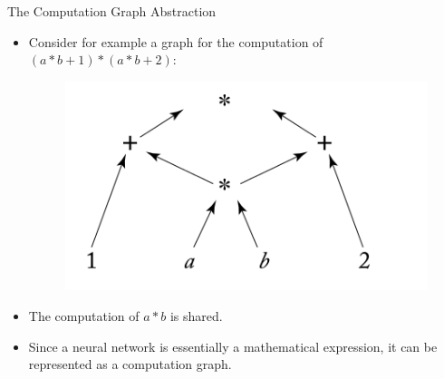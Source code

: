 \documentclass[handout]{beamer}
\begin{document}
\begin{frame}{The Computation Graph Abstraction}
\begin{scriptsize}
\begin{itemize}

\item Consider for example a graph for the computation of $(a*b+1)*(a*b+2)$:

\begin{figure}[htb]
	\centering
	 \includegraphics[scale=0.25]{pics/compGraph.png}
\end{figure}

\item The computation of $a*b$ is shared.

\item Since a neural network is essentially a mathematical expression, it can be represented as a computation graph.

\end{itemize}
\end{scriptsize}
\end{frame}
\end{document}
